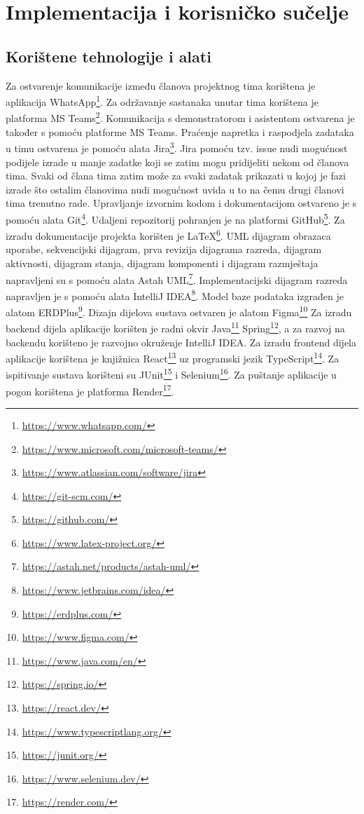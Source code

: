 \chapter{Implementacija i korisničko sučelje}
		
		
		\section{Korištene tehnologije i alati}
		
			
			 
			 Za ostvarenje komunikacije između članova projektnog tima korištena je aplikacija WhatsApp\footnote{\url{https://www.whatsapp.com/}}. Za održavanje sastanaka unutar tima korištena je platforma MS Teams\footnote{\url{https://www.microsoft.com/microsoft-teams/}}. Komunikacija s demonstratorom i asistentom ostvarena je također s pomoću platforme MS Teams. Praćenje napretka i raspodjela zadataka u timu ostvarena je pomoću alata Jira\footnote{\url{https://www.atlassian.com/software/jira}}. Jira pomoću tzv. issue nudi mogućnost podijele izrade u manje zadatke koji se zatim mogu pridijeliti nekom od članova tima. Svaki od člana tima zatim može za svaki zadatak prikazati u kojoj je fazi izrade što ostalim članovima nudi mogućnost uvida u to na čemu drugi članovi tima trenutno rade. Upravljanje izvornim kodom i dokumentacijom ostvareno je s pomoću alata Git\footnote{\url{https://git-scm.com/}}. Udaljeni repozitorij pohranjen je na platformi GitHub\footnote{\url{https://github.com/}}. Za izradu dokumentacije projekta korišten je LaTeX\footnote{\url{https://www.latex-project.org/}}. UML dijagram obrazaca uporabe, sekvencijski dijagram, prva revizija dijagrama razreda, dijagram aktivnosti, dijagram stanja, dijagram komponenti i dijagram razmještaja napravljeni su s pomoću alata Astah UML\footnote{\url{https://astah.net/products/astah-uml/}}. Implementacijski dijagram razreda napravljen je s pomoću alata IntelliJ IDEA\footnote{\url{https://www.jetbrains.com/idea/}}. Model baze podataka izgrađen je alatom ERDPlus\footnote{\url{https://erdplus.com/}}. Dizajn dijelova sustava ostvaren je alatom Figma\footnote{\url{https://www.figma.com/}} Za izradu backend dijela aplikacije korišten je radni okvir Java\footnote{\url{https://www.java.com/en/}} Spring\footnote{\url{https://spring.io/}}, a za razvoj na backendu korišteno je razvojno okruženje IntelliJ IDEA. Za izradu frontend dijela aplikacije korištena je knjižnica React\footnote{\url{https://react.dev/}} uz programski jezik TypeScript\footnote{\url{https://www.typescriptlang.org/}}. Za ispitivanje sustava korišteni su JUnit\footnote{\url{https://junit.org/}} i Selenium\footnote{\url{https://www.selenium.dev/}}. Za puštanje aplikacije u pogon korištena je platforma Render\footnote{\url{https://render.com/}}.
			
